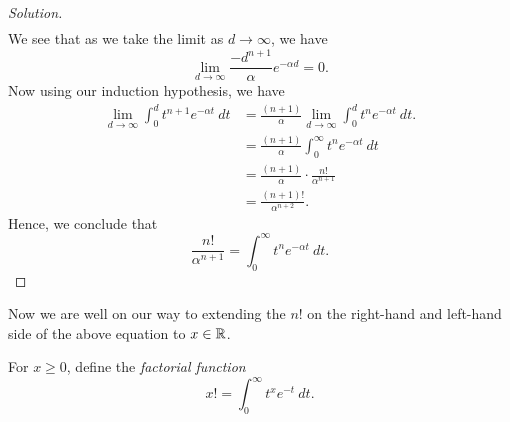 \begin{enumerate}
\begin{proof}[Solution]
\begin{align*}
        \end{align*}
        We see that as we take the limit as \( d \to \infty  \), we have 
        \[  \lim_{ d \to \infty  }  \frac{  - d^{n+1} }{ \alpha } e^{- \alpha d } = 0.\] Now using our induction hypothesis, we have 
        \begin{align*}
            \lim_{ d \to \infty  } \int_{ 0 }^{ d  } t^{n+1} e^{ - \alpha t } \ dt &= \frac{ (n+1)  }{ \alpha }  \lim_{ d \to \infty  } \int_{ 0 }^{ d }  t^{n} e^{ - \alpha t } \  dt.    \\
                                                                                   &= \frac{ (n+1)  }{ \alpha }  \int_{ 0 }^{ \infty  }  t^{n} e^{- \alpha t } \ dt \\
                                                                                   &= \frac{ (n+1)  }{ \alpha } \cdot \frac{ n!  }{ \alpha^{n+1}  } \\
                                                                                   &= \frac{ (n+1)!  }{ \alpha^{n+2} }.
        \end{align*}
        Hence, we conclude that 
        \[ \frac{ n!  }{ \alpha^{n+1} } =  \int_{ 0 }^{ \infty  }  t^{n} e^{ - \alpha t } \ dt.\]  
        \end{proof}
\end{enumerate}

Now we are well on our way to extending the \( n!  \) on the right-hand and left-hand side of the above equation to \( x \in \mathbb{R}  \).

\begin{definition}{}{}
    For \( x \geq 0  \), define the \textit{factorial function} 
    \[  x! = \int_{ 0 }^{ \infty  } t^{x} e^{-t} \ dt. \]
\end{definition}

